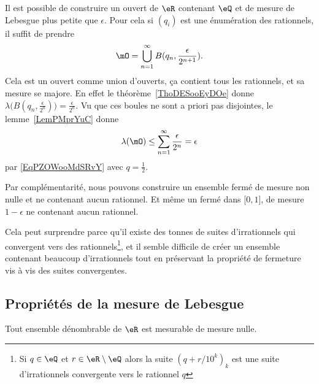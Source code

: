 \begin{example}
    Il est possible de construire un ouvert de $\eR$ contenant \( \eQ\) et de mesure de Lebesgue plus petite que \( \epsilon\). Pour cela si \( (q_i)\) est une énumération des rationnels, il suffit de prendre
    \begin{equation}
        \mO=\bigcup_{n=1}^{\infty}B(q_n,\frac{ \epsilon }{ 2^{n+1} }).
    \end{equation}
    Cela est un ouvert comme union d'ouverts, ça contient tous les rationnels, et sa mesure se majore. En effet le théorème~\ref{ThoDESooEyDOe} donne \( \lambda\big( B(q_n,\frac{\epsilon }{ 2^n }) \big)=\frac{ \epsilon }{ 2^n }\). Vu que ces boules ne sont a priori pas disjointes, le lemme~\ref{LemPMprYuC} donne
    \begin{equation}
        \lambda(\mO) \leq \sum_{n=1}^{\infty}\frac{ \epsilon }{ 2^n }=\epsilon
    \end{equation}
    par \eqref{EqPZOWooMdSRvY} avec \( q=\frac{ 1 }{2}\).

    Par complémentarité, nous pouvons construire un ensemble fermé de mesure non nulle et ne contenant aucun rationnel. Et même un fermé dans \( \mathopen[ 0 , 1 \mathclose]\), de mesure \( 1-\epsilon\) ne contenant aucun rationnel.

    Cela peut surprendre parce qu'il existe des tonnes de suites d'irrationnels qui convergent vers des rationnels\footnote{Si \( q\in \eQ\) et \( r\in \eR\setminus \eQ\) alors la suite \( (q+r/10^k)_k\) est une suite d'irrationnels convergente vers le rationnel \( q\)}, et il semble difficile de créer un ensemble contenant beaucoup d'irrationnels tout en préservant la propriété de fermeture vis à vis des suites convergentes.
\end{example}

\subsection{Propriétés de la mesure de Lebesgue}

\begin{proposition}
    Tout ensemble dénombrable de \( \eR\) est mesurable de mesure nulle.
\end{proposition}

